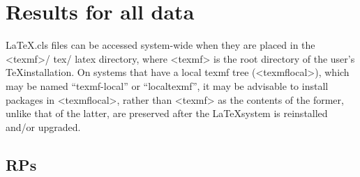 		\chapter{Results for all data} \label{appendix:d}



\LaTeX .cls  files can be accessed system-wide when they are placed in the
<texmf>/ tex/ latex directory, where <texmf> is the root directory of the user’s
\TeX installation.
On systems that have a local texmf tree (<texmflocal>), which
may be named ``texmf-local'' or ``localtexmf'', it may be advisable to install
packages in <texmflocal>, rather than <texmf> as the contents of the former,
unlike that of the latter, are preserved after the \LaTeX system is reinstalled
and/or upgraded.



\section{RPs} \label{appendix:d:rps}
